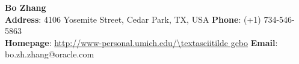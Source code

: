 \documentclass[11pt]{res}
\newcommand{\style}[1]{\color{Blue}\large\textsc{#1}}
\begin{document}
\begin{center}
\vspace{-3cm}

\textbf{\LARGE Bo Zhang}\\
\vspace{-1.0mm}
\hspace{-1.35cm}
{\indent \bf Address}: 4106 Yosemite Street, Cedar Park,  TX, USA \hfill {\bf Phone}: (+1) 734-546-5863\\
\vspace{-1.2mm}
\hspace{-1.35cm}
{\indent \bf Homepage}: {\color{Blue}\url{http://www-personal.umich.edu/\textasciitilde gcbo}} \hfill {\bf Email}: bo.zh.zhang@oracle.com\\
\end{center}


\begin{resume}


\vspace{-35pt}


\end{resume}
\end{document}
